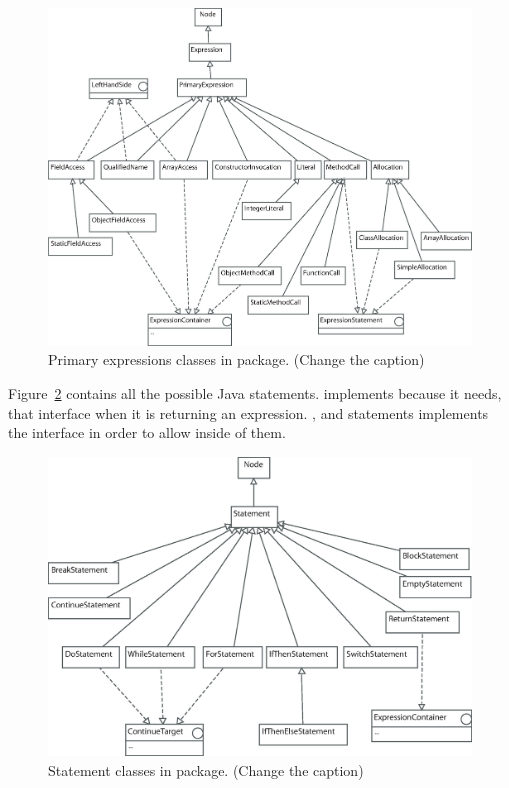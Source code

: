 \begin{figure}[!htb]
\begin{center}
\includegraphics[width=\textwidth]{images/primaryexpressions.eps}
\caption{Primary expressions classes in  package. (Change the caption)}
\label{fig:primary_expression_classes}
\end{center}
\end{figure}

Figure~\ref{fig:statement_classes} contains all the possible Java
statements.  implements
 because it needs, that interface when it is
returning an expression. ,  and  statements
implements the  interface in order to
allow  inside of them.


\begin{figure}[!htb]
\begin{center}
\includegraphics[width=\textwidth]{images/statements.eps}
\caption{Statement classes in  package. (Change the caption)}
\label{fig:statement_classes}
\end{center}
\end{figure}


